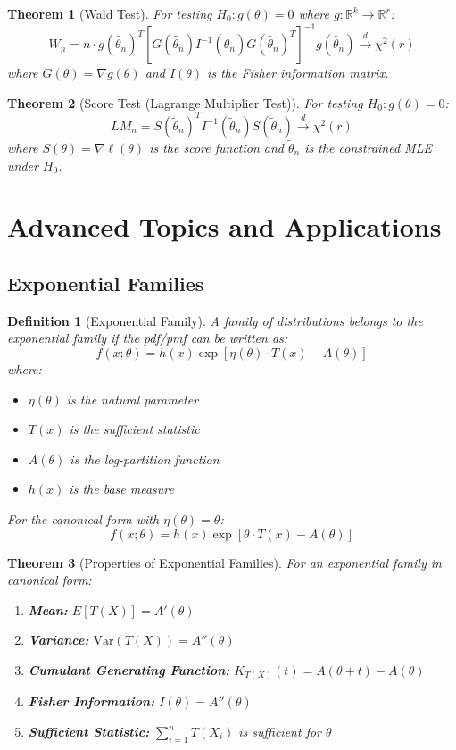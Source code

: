 \documentclass[12pt,a4paper]{article}
\newtheorem{theorem}{Theorem}[section]
\newtheorem{definition}{Definition}[section]
\theoremstyle{remark}
\begin{document}
\begin{theorem}[Wald Test]
For testing $H_0: g(\theta) = 0$ where $g: \mathbb{R}^k \to \mathbb{R}^r$:
$$W_n = n \cdot g(\hat{\theta}_n)^T [G(\hat{\theta}_n) I^{-1}(\hat{\theta}_n) G(\hat{\theta}_n)^T]^{-1} g(\hat{\theta}_n) \stackrel{d}{\to} \chi^2(r)$$
where $G(\theta) = \nabla g(\theta)$ and $I(\theta)$ is the Fisher information matrix.
\end{theorem}

\begin{theorem}[Score Test (Lagrange Multiplier Test)]
For testing $H_0: g(\theta) = 0$:
$$LM_n = S(\tilde{\theta}_n)^T I^{-1}(\tilde{\theta}_n) S(\tilde{\theta}_n) \stackrel{d}{\to} \chi^2(r)$$
where $S(\theta) = \nabla \ell(\theta)$ is the score function and $\tilde{\theta}_n$ is the constrained MLE under $H_0$.
\end{theorem}

\section{Advanced Topics and Applications}

\subsection{Exponential Families}

\begin{definition}[Exponential Family]
A family of distributions belongs to the exponential family if the pdf/pmf can be written as:
$$f(x; \theta) = h(x) \exp\left[\eta(\theta) \cdot T(x) - A(\theta)\right]$$
where:
\begin{itemize}
\item $\eta(\theta)$ is the natural parameter
\item $T(x)$ is the sufficient statistic
\item $A(\theta)$ is the log-partition function
\item $h(x)$ is the base measure
\end{itemize}

For the canonical form with $\eta(\theta) = \theta$:
$$f(x; \theta) = h(x) \exp[\theta \cdot T(x) - A(\theta)]$$
\end{definition}

\begin{theorem}[Properties of Exponential Families]
For an exponential family in canonical form:
\begin{enumerate}
\item \textbf{Mean:} $E[T(X)] = A'(\theta)$
\item \textbf{Variance:} $\text{Var}(T(X)) = A''(\theta)$
\item \textbf{Cumulant Generating Function:} $K_{T(X)}(t) = A(\theta + t) - A(\theta)$
\item \textbf{Fisher Information:} $I(\theta) = A''(\theta)$
\item \textbf{Sufficient Statistic:} $\sum_{i=1}^n T(X_i)$ is sufficient for $\theta$
\end{enumerate}
\end{theorem}
\end{document}
